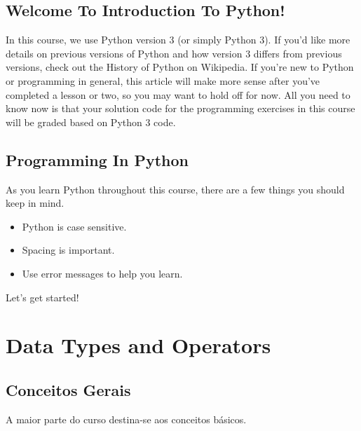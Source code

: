\documentclass[]{book}
\providecommand{\tightlist}{%
  \setlength{\itemsep}{0pt}\setlength{\parskip}{0pt}}
\begin{document}
\subsection{Welcome To Introduction To
Python!}\label{welcome-to-introduction-to-python}

In this course, we use Python version 3 (or simply Python 3). If you'd
like more details on previous versions of Python and how version 3
differs from previous versions, check out the History of Python on
Wikipedia. If you're new to Python or programming in general, this
article will make more sense after you've completed a lesson or two, so
you may want to hold off for now. All you need to know now is that your
solution code for the programming exercises in this course will be
graded based on Python 3 code.

\subsection{Programming In Python}\label{programming-in-python}

As you learn Python throughout this course, there are a few things you
should keep in mind.

\begin{itemize}
\tightlist
\item
  Python is case sensitive.
\item
  Spacing is important.
\item
  Use error messages to help you learn.
\end{itemize}

Let's get started!

\section{Data Types and Operators}\label{data-types-and-operators}

\subsection{Conceitos Gerais}\label{conceitos-gerais}

A maior parte do curso destina-se aos conceitos básicos.
\end{document}
